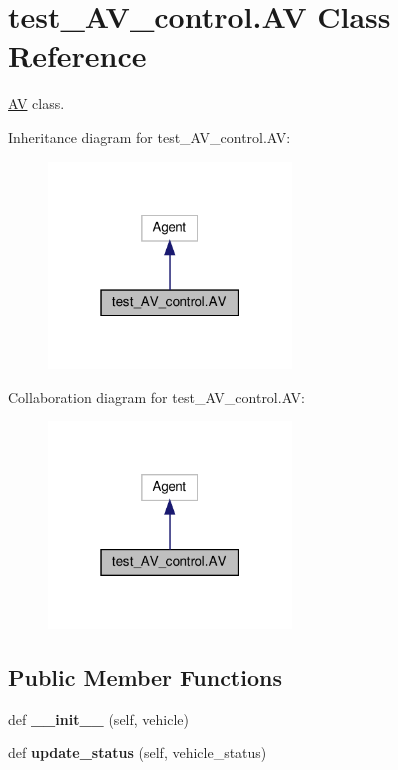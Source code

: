 \hypertarget{classtest__AV__control_1_1AV}{}\section{test\+\_\+\+A\+V\+\_\+control.\+AV Class Reference}
\label{classtest__AV__control_1_1AV}


\hyperlink{classtest__AV__control_1_1AV}{AV} class.  




Inheritance diagram for test\+\_\+\+A\+V\+\_\+control.\+AV\+:
\nopagebreak
\begin{figure}[H]
\begin{center}
\leavevmode
\includegraphics[width=183pt]{d5/d53/classtest__AV__control_1_1AV__inherit__graph}
\end{center}
\end{figure}


Collaboration diagram for test\+\_\+\+A\+V\+\_\+control.\+AV\+:
\nopagebreak
\begin{figure}[H]
\begin{center}
\leavevmode
\includegraphics[width=183pt]{da/d5b/classtest__AV__control_1_1AV__coll__graph}
\end{center}
\end{figure}
\subsection*{Public Member Functions}
\begin{DoxyCompactItemize}
\item 
\mbox{\label{classtest__AV__control_1_1AV_aa16b44e2795d96ee898307a467ebb22a}} 
def {\bfseries \+\_\+\+\_\+init\+\_\+\+\_\+} (self, vehicle)
\item 
\mbox{\label{classtest__AV__control_1_1AV_ab638809ebc044a4d8dbdf703d5831479}} 
def {\bfseries update\+\_\+status} (self, vehicle\+\_\+status)
\end{DoxyCompactItemize}
